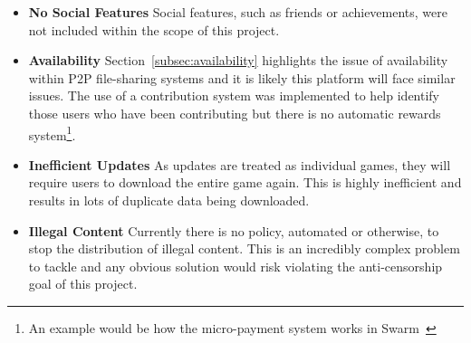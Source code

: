 \begin{itemize}
  \item \textbf{No Social Features} Social features, such as friends or achievements, were not included within the scope of this project.
  \item \textbf{Availability} Section~\ref{subsec:availability} highlights the issue of availability within P2P file-sharing systems and it is likely this platform will face similar issues.
  The use of a contribution system was implemented to help identify those users who have been contributing but there is no automatic rewards system\footnote{An example would be how the micro-payment system works in Swarm~\cite{hartman_swarm_1999}}.
  \item \textbf{Inefficient Updates} As updates are treated as individual games, they will require users to download the entire game again. This is highly inefficient and results in lots of duplicate data being downloaded.
  \item \textbf{Illegal Content} Currently there is no policy, automated or otherwise, to stop the distribution of illegal content. This is an incredibly complex problem to tackle and any obvious solution would risk violating the anti-censorship goal of this project. 
\end{itemize}